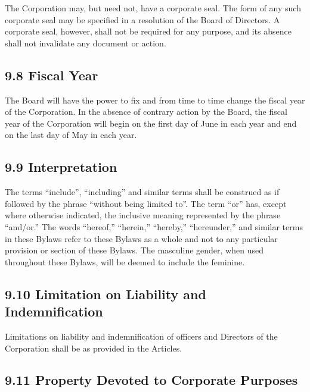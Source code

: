 \documentclass[
]{book}
\begin{document}
The Corporation may, but need not, have a corporate seal. The form of any such corporate seal may be specified in a resolution of the Board of Directors. A corporate seal, however, shall not be required for any purpose, and its absence shall not invalidate any document or action.

\subsection*{9.8 Fiscal Year}\label{fiscal-year}

The Board will have the power to fix and from time to time change the fiscal year of the Corporation. In the absence of contrary action by the Board, the fiscal year of the Corporation will begin on the first day of June in each year and end on the last day of May in each year.

\subsection*{9.9 Interpretation}\label{interpretation}

The terms ``include'', ``including'' and similar terms shall be construed as if followed by the phrase ``without being limited to''. The term ``or'' has, except where otherwise indicated, the inclusive meaning represented by the phrase ``and/or.'' The words ``hereof,'' ``herein,'' ``hereby,'' ``hereunder,'' and similar terms in these Bylaws refer to these Bylaws as a whole and not to any particular provision or section of these Bylaws. The masculine gender, when used throughout these Bylaws, will be deemed to include the feminine.

\subsection*{9.10 Limitation on Liability and Indemnification}\label{limitation-on-liability-and-indemnification}

Limitations on liability and indemnification of officers and Directors of the Corporation shall be as provided in the Articles.

\subsection*{9.11 Property Devoted to Corporate Purposes}\label{property-devoted-to-corporate-purposes}
\end{document}
